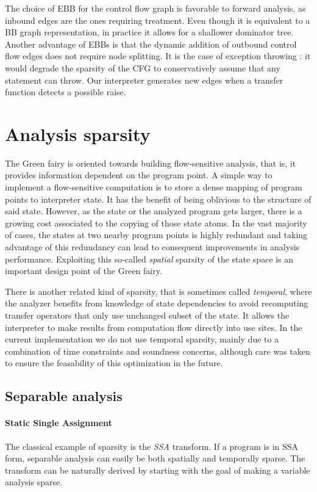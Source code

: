 \documentclass[11pt]{article}
\begin{document}
The choice of EBB for the control flow graph is favorable to forward analysis, as inbound edges are the ones requiring treatment. Even though it is equivalent to a BB graph representation, in practice it allows for a shallower dominator tree.
Another advantage of EBBs is that the dynamic addition of outbound control flow edges does not require node splitting. It is the case of exception throwing : it would degrade the sparsity of the CFG to conservatively assume that any statement can throw. Our interpreter generates new edges when a transfer function detects a possible raise.

\section*{Analysis sparsity}

The Green fairy is oriented towards building flow-sensitive analysis, that is, it provides information dependent on the program point.
A simple way to implement a flow-sensitive computation is to store a dense mapping of program points to interpreter state. It has the benefit of being oblivious to the structure of said state.
However, as the state or the analyzed program gets larger, there is a growing cost associated to the copying of those state atoms.
In the vast majority of cases, the states at two nearby program points is highly redundant and taking advantage of this redundancy can lead to consequent improvements in analysis performance. Exploiting this so-called \emph{spatial} sparsity of the state space is an important design point of the Green fairy.

There is another related kind of sparsity, that is sometimes called \emph{temporal}, where the analyzer benefits from knowledge of state dependencies to avoid recomputing transfer operators that only use unchanged subset of the state. It allows the interpreter to make results from computation flow directly into use sites. In the current implementation we do not use temporal sparsity, mainly due to a combination of time constraints and soundness concerns, although care was taken to ensure the feasability of this optimization in the future.

\subsection*{Separable analysis}

\paragraph{Static Single Assignment} The classical example of sparsity is the \emph{SSA} transform. If a program is in SSA form, separable analysis can easily be both spatially and temporally sparse. The transform can be naturally derived by starting with the goal of making a variable analysis sparse.
\end{document}
